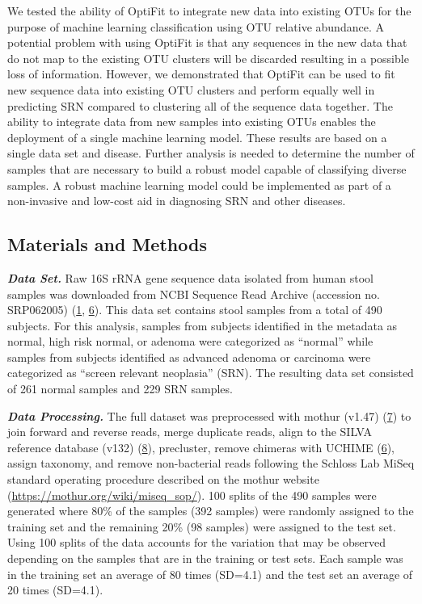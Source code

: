 \documentclass[
]{article}
\begin{document}
We tested the ability of OptiFit to integrate new data into existing
OTUs for the purpose of machine learning classification using OTU
relative abundance. A potential problem with using OptiFit is that any
sequences in the new data that do not map to the existing OTU clusters
will be discarded resulting in a possible loss of information. However,
we demonstrated that OptiFit can be used to fit new sequence data into
existing OTU clusters and perform equally well in predicting SRN
compared to clustering all of the sequence data together. The ability to
integrate data from new samples into existing OTUs enables the
deployment of a single machine learning model. These results are based
on a single data set and disease. Further analysis is needed to
determine the number of samples that are necessary to build a robust
model capable of classifying diverse samples. A robust machine learning
model could be implemented as part of a non-invasive and low-cost aid in
diagnosing SRN and other diseases.

\hypertarget{materials-and-methods}{%
\subsection{Materials and Methods}\label{materials-and-methods}}

\textbf{\emph{Data Set.}} Raw 16S rRNA gene sequence data isolated from
human stool samples was downloaded from NCBI Sequence Read Archive
(accession no. SRP062005) (\protect\hyperlink{ref-baxter2016}{1},
\protect\hyperlink{ref-edgar2011}{6}). This data set contains stool
samples from a total of 490 subjects. For this analysis, samples from
subjects identified in the metadata as normal, high risk normal, or
adenoma were categorized as ``normal'' while samples from subjects
identified as advanced adenoma or carcinoma were categorized as ``screen
relevant neoplasia'' (SRN). The resulting data set consisted of 261
normal samples and 229 SRN samples.

\textbf{\emph{Data Processing.}} The full dataset was preprocessed with
mothur (v1.47) (\protect\hyperlink{ref-schloss2009}{7}) to join forward
and reverse reads, merge duplicate reads, align to the SILVA reference
database (v132) (\protect\hyperlink{ref-quast2013}{8}), precluster,
remove chimeras with UCHIME (\protect\hyperlink{ref-edgar2011}{6}),
assign taxonomy, and remove non-bacterial reads following the Schloss
Lab MiSeq standard operating procedure described on the mothur website
(\url{https://mothur.org/wiki/miseq_sop/}). 100 splits of the 490
samples were generated where 80\% of the samples (392 samples) were
randomly assigned to the training set and the remaining 20\% (98
samples) were assigned to the test set. Using 100 splits of the data
accounts for the variation that may be observed depending on the samples
that are in the training or test sets. Each sample was in the training
set an average of 80 times (SD=4.1) and the test set an average of 20
times (SD=4.1).
\end{document}
